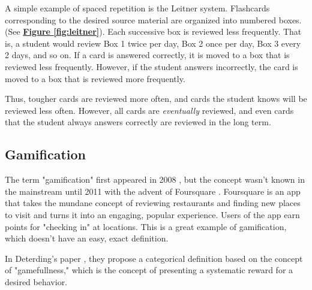 \par A simple example of spaced repetition is the Leitner system. Flashcards corresponding to the desired source material are organized into numbered boxes. (See \textbf{\hyperref[fig:leitner]{Figure \ref*{fig:leitner}}}). Each successive box is reviewed less frequently. That is, a student would review Box 1 twice per day, Box 2 once per day, Box 3 every 2 days, and so on. If a card is answered correctly, it is moved to a box that is reviewed less frequently. However, if the student answers incorrectly, the card is moved to a box that is reviewed more frequently.

\par Thus, tougher cards are reviewed more often, and cards the student knows will be reviewed less often. However, all cards are \textit{eventually} reviewed, and even cards that the student always answers correctly are reviewed in the long term.

\subsection{Gamification}
\par The term "gamification" first appeared in 2008 , but the concept wasn't known in the mainstream until 2011 with the advent of Foursquare \cite{Deterding:2011:GDE:2181037.2181040}. Foursquare is an app that takes the mundane concept of reviewing restaurants and finding new places to visit and turns it into an engaging, popular experience. Users of the app earn points for "checking in" at locations. This is a great example of gamification, which doesn't have an easy, exact definition. 

\par In Deterding's paper \cite{Deterding:2011:GDE:2181037.2181040}, they propose a categorical definition based on the concept of "gamefullness," which is the concept of presenting a systematic reward for a desired behavior.  



